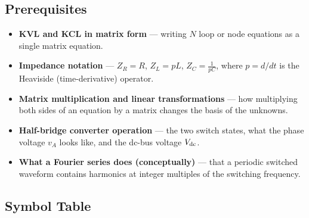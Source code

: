 \subsection{Prerequisites}

\begin{statebox}
\begin{itemize}
    \item \textbf{KVL and KCL in matrix form} — writing $N$ loop or
          node equations as a single matrix equation.
    \item \textbf{Impedance notation} — $Z_R = R$, $Z_L = pL$,
          $Z_C = \frac{1}{pC}$, where $p = d/dt$ is the Heaviside
          (time-derivative) operator.
    \item \textbf{Matrix multiplication and linear transformations}
          — how multiplying both sides of an equation by a matrix
          changes the basis of the unknowns.
    \item \textbf{Half-bridge converter operation} — the two switch
          states, what the phase voltage $v_A$ looks like, and the
          dc-bus voltage $V_{\mathrm{dc}}$.
    \item \textbf{What a Fourier series does (conceptually)} — that
          a periodic switched waveform contains harmonics at integer
          multiples of the switching frequency.
\end{itemize}
\end{statebox}

\subsection{Symbol Table}

